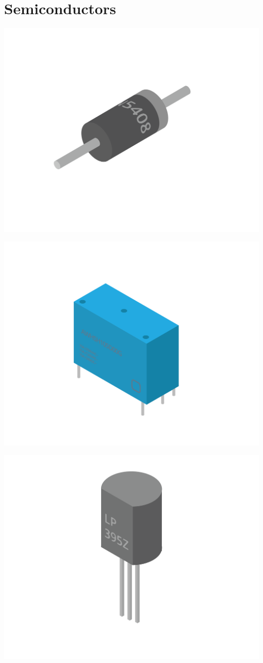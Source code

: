 \chapter{Semiconductors}

\includegraphics[width=.75\textwidth]{diodeReal.png}

\includegraphics[width=.75\textwidth]{relayReal.png}

\includegraphics[width=.75\textwidth]{transistorReal.png}


